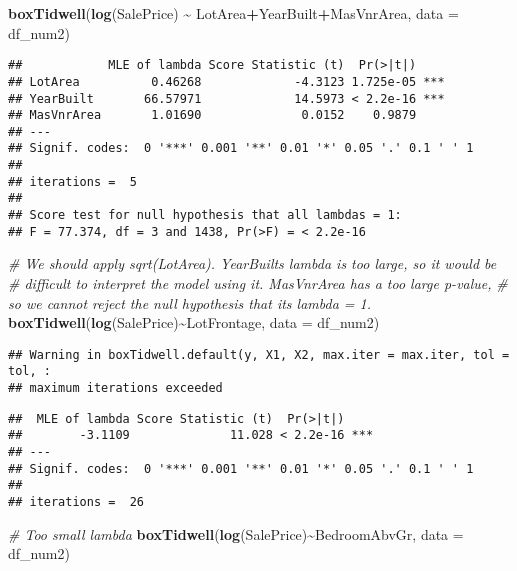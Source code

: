 \documentclass[
]{article}
\newenvironment{Shaded}{\begin{snugshade}}{\end{snugshade}}
\newcommand{\AttributeTok}[1]{\textcolor[rgb]{0.13,0.29,0.53}{#1}}
\newcommand{\CommentTok}[1]{\textcolor[rgb]{0.56,0.35,0.01}{\textit{#1}}}
\newcommand{\FunctionTok}[1]{\textcolor[rgb]{0.13,0.29,0.53}{\textbf{#1}}}
\newcommand{\NormalTok}[1]{#1}
\newcommand{\SpecialCharTok}[1]{\textcolor[rgb]{0.81,0.36,0.00}{\textbf{#1}}}
\begin{document}
\begin{Shaded}
\begin{Highlighting}[]
\FunctionTok{boxTidwell}\NormalTok{(}\FunctionTok{log}\NormalTok{(SalePrice) }\SpecialCharTok{\textasciitilde{}}\NormalTok{ LotArea}\SpecialCharTok{+}\NormalTok{YearBuilt}\SpecialCharTok{+}\NormalTok{MasVnrArea, }\AttributeTok{data =}\NormalTok{ df\_num2)}
\end{Highlighting}
\end{Shaded}

\begin{verbatim}
##            MLE of lambda Score Statistic (t)  Pr(>|t|)    
## LotArea          0.46268             -4.3123 1.725e-05 ***
## YearBuilt       66.57971             14.5973 < 2.2e-16 ***
## MasVnrArea       1.01690              0.0152    0.9879    
## ---
## Signif. codes:  0 '***' 0.001 '**' 0.01 '*' 0.05 '.' 0.1 ' ' 1
## 
## iterations =  5 
## 
## Score test for null hypothesis that all lambdas = 1:
## F = 77.374, df = 3 and 1438, Pr(>F) = < 2.2e-16
\end{verbatim}

\begin{Shaded}
\begin{Highlighting}[]
\CommentTok{\# We should apply sqrt(LotArea). YearBuilt\textquotesingle{}s lambda is too large, so it would be}
\CommentTok{\# difficult to interpret the model using it. MasVnrArea has a too large p{-}value,}
\CommentTok{\# so we cannot reject the null hypothesis that its lambda = 1.}
\FunctionTok{boxTidwell}\NormalTok{(}\FunctionTok{log}\NormalTok{(SalePrice)}\SpecialCharTok{\textasciitilde{}}\NormalTok{LotFrontage, }\AttributeTok{data =}\NormalTok{ df\_num2)}
\end{Highlighting}
\end{Shaded}

\begin{verbatim}
## Warning in boxTidwell.default(y, X1, X2, max.iter = max.iter, tol = tol, :
## maximum iterations exceeded
\end{verbatim}

\begin{verbatim}
##  MLE of lambda Score Statistic (t)  Pr(>|t|)    
##        -3.1109              11.028 < 2.2e-16 ***
## ---
## Signif. codes:  0 '***' 0.001 '**' 0.01 '*' 0.05 '.' 0.1 ' ' 1
## 
## iterations =  26
\end{verbatim}

\begin{Shaded}
\begin{Highlighting}[]
\CommentTok{\# Too small lambda}
\FunctionTok{boxTidwell}\NormalTok{(}\FunctionTok{log}\NormalTok{(SalePrice)}\SpecialCharTok{\textasciitilde{}}\NormalTok{BedroomAbvGr, }\AttributeTok{data =}\NormalTok{ df\_num2)}
\end{Highlighting}
\end{Shaded}
\end{document}
